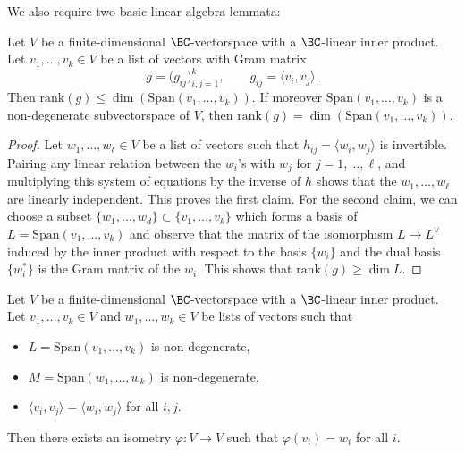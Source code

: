 We also require two basic linear algebra lemmata:
\begin{Lemma} \label{lemma:la1}
Let $V$ be a finite-dimensional $\BC$-vectorspace with a $\BC$-linear inner product.
Let $v_1, \dots, v_k \in V$ be a list of vectors with Gram matrix
\[
g = \big( g_{ij} \big)_{i,j=1}^{k}, \qquad g_{ij} = \langle v_i, v_j \rangle.
 \]
Then $\mathrm{rank}(g) \leq \dim( \mathrm{Span}(v_1, \dots, v_k))$.
If moreover $\mathrm{Span}(v_1, \dots, v_k)$ is a non-degenerate subvectorspace of $V$, then
$\mathrm{rank}(g) = \dim( \mathrm{Span}(v_1, \dots, v_k))$.
\end{Lemma}
\begin{proof}
Let $w_1, \dots, w_{\ell} \in V$ be a list of vectors such that $h_{ij}=\langle w_i, w_j \rangle$ is invertible.
Pairing any linear relation between the $w_i$'s with $w_j$ for $j=1,\dots, \ell$,
and multiplying this system of equations by the inverse of $h$
shows that the $w_1, \dots, w_{\ell}$ are linearly independent.
This proves the first claim.
For the second claim, we can choose a subset $\{ w_1, \dots, w_d \} \subset \{ v_1, \dots, v_k \}$ which forms a basis of $L = \mathrm{Span}(v_1, \dots, v_k)$
and observe that the matrix of the isomorphism $L \to L^{\vee}$ induced by the inner product
with respect to the basis $\{ w_i \}$ and the dual basis $\{ w_i^{\ast} \}$
is the Gram matrix of the $w_i$.
This shows that $\mathrm{rank}(g) \geq \dim L$.
\end{proof}
\begin{Lemma} \label{lemma:a2}
Let $V$ be a finite-dimensional $\BC$-vectorspace with a $\BC$-linear inner product.
Let $v_1, \dots, v_k \in V$ and $w_1, \dots, w_k \in V$ be lists of vectors such that
\begin{itemize}\itemsep=0pt
\item[$(i)$] $L = \mathrm{Span}(v_1, \dots, v_k)$ is non-degenerate,
\item[$(ii)$] $M = \mathrm{Span}(w_1, \dots, w_k)$ is non-degenerate,
\item[$(iii)$] $\langle v_i, v_j \rangle = \langle w_i, w_j \rangle$ for all $i,j$.
\end{itemize}
Then there exists an isometry $\varphi \colon V \to V$ such that $\varphi(v_i) = w_i$ for all $i$.
\end{Lemma}

